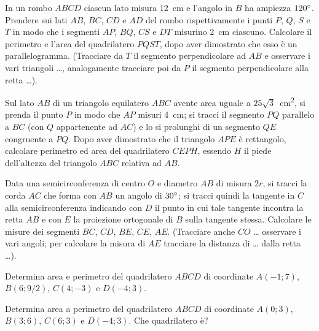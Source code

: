 \begin{multicols}{2}
\begin{esercizio}
\label{ese:7.88}
In un rombo $ABCD$ ciascun lato misura 12~cm e l'angolo in $B$ ha ampiezza $120{}^{\circ}$. Prendere sui lati $AB$, $BC$, $CD$ e $AD$ del rombo rispettivamente i punti $P$, $Q$, $S$ e $T$ in modo che i segmenti $AP$, $BQ$, $CS$ e $DT$ misurino 2~cm ciascuno. Calcolare il perimetro e l'area del quadrilatero $PQST$, dopo aver dimostrato che esso è un parallelogramma. (Tracciare da $T$ il segmento perpendicolare ad $AB$ e osservare i vari triangoli \ldots{}, analogamente tracciare poi da $P$ il segmento perpendicolare alla retta \ldots{}).  
\end{esercizio}

\begin{esercizio}
\label{ese:7.89}
Sul lato $AB$ di un triangolo equilatero $ABC$ avente area uguale a $25\sqrt{3}$~cm\textsuperscript{2}, si prenda il punto $P$ in modo che $AP$ misuri 4~cm; si tracci il segmento $PQ$ parallelo a $BC$ (con $Q$ appartenente ad $AC$) e lo si prolunghi di un segmento $QE$ congruente a $PQ$. Dopo aver dimostrato che il triangolo $APE$ è rettangolo, calcolare perimetro ed area del quadrilatero $CEPH$, essendo $H$ il piede dell'altezza del triangolo $ABC$ relativa ad $AB$.
\end{esercizio}

\begin{esercizio}
\label{ese:7.90}
Data una semicirconferenza di centro $O$ e diametro $AB$ di misura $2r$, si tracci la corda $AC$ che forma con $AB$ un angolo di $30{}^{\circ}$; si tracci quindi la tangente in $C$ alla semicirconferenza indicando con $D$ il punto in cui tale tangente incontra la retta $AB$ e con $E$ la proiezione ortogonale di $B$ sulla tangente stessa. Calcolare le misure dei segmenti $BC$, $CD$, $BE$, $CE$, $AE$. (Tracciare anche $CO$ \ldots{} osservare i vari angoli; per calcolare la misura di $AE$ tracciare la distanza di \ldots{} dalla retta \ldots{}).
\end{esercizio}

\begin{esercizio}
\label{ese:7.91}
Determina area e perimetro del quadrilatero $ABCD$ di coordinate $A(-1;7)$, $B(6;9/2)$, $C(4;-3)$ e $D(-4;3)$.
\end{esercizio}

\begin{esercizio}
\label{ese:7.92}
Determina area a perimetro del quadrilatero $ABCD$ di coordinate $A(0;3)$, $B(3;6)$, $C(6;3)$ e $D(-4;3)$. Che quadrilatero è?
\end{esercizio}


\end{multicols}
